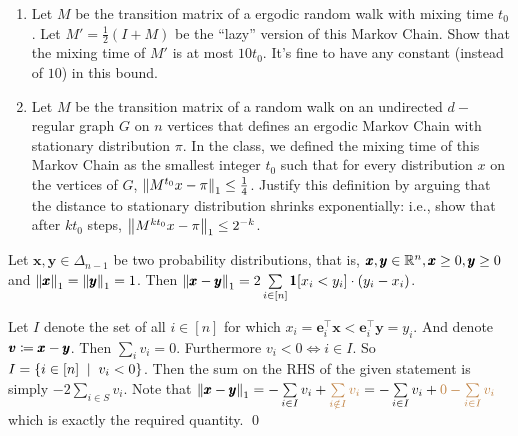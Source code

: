 \newpage
\pb
\begin{enumerate}[leftmargin=*, label=(\alph*)]
\item Let $M$ be the transition matrix of a ergodic random walk with mixing time $t_{0}$. Let $M' = \frac12(I + M)$ be the ``lazy'' version of this Markov Chain. Show that the mixing time of $M'$ is at most $10t_{0}$. It’s fine to have any constant (instead of $10$) in this bound.
\item Let $M$ be the transition matrix of a random walk on an undirected $d-$regular
graph $G$ on $n$ vertices that defines an ergodic Markov Chain with stationary
distribution $\pi$. In the class, we defined the mixing time of this Markov Chain
as the smallest integer $t_{0}$ such that for every distribution $x$ on the vertices of $G$, $\left\lVert M^{t_{0}} x-\pi \right\rVert_{1} \le \frac14$. Justify this definition by arguing that the distance to stationary distribution shrinks exponentially: i.e., show that after $kt_{0}$ steps, $\left\lVert M^{kt_{0}} x-\pi \right\rVert_{1} \le2^{-k}$.
\end{enumerate}
\soln

\begin{lemma}\label{maxelt}
Let $\pmb x,\pmb y\in \Delta_{n-1}$ be two probability distributions, that is, $\pmb x,\pmb y\in \mathbb{R}^{n}, \pmb x\ge 0, \pmb y\ge 0$ and $\left\lVert \pmb x \right\rVert_{1} = \left\lVert \pmb y \right\rVert_{1}=1$. Then $\left\lVert \pmb x-\pmb y \right\rVert_{1} = 2\sum\limits_{i\in[n]} \pmb 1[x_{i} < y_{i}]\cdot (y_{i}-x_{i})$.
\end{lemma}
\begin{pf}
Let $I$ denote the set of all $i\in [n]$ for which $x_{i}=\pmb e_{i}^{\top}\pmb x < \pmb e_{i}^{\top}\pmb y = y_{i}$. And denote $\pmb v\coloneqq \pmb x-\pmb y$. Then $\sum_{i}v_{i}=0$. Furthermore $v_{i}<0\iff i\in I$. So $I=\set{i\in[n]\st v_{i}<0}$. Then the sum on the RHS of the given statement is simply $-2\sum\limits_{i\in S}v_{i}$. Note that $\left\lVert \pmb x-\pmb y \right\rVert_{1} = -\sum\limits_{i\in I}v_{i} + {\color{brown}\sum\limits_{i\notin I}v_{i}} = -\sum\limits_{i\in I}v_{i} + {\color{brown}0 - \sum\limits_{i\in I}v_{i}}$ which is exactly the required quantity.
\qed\end{pf}

